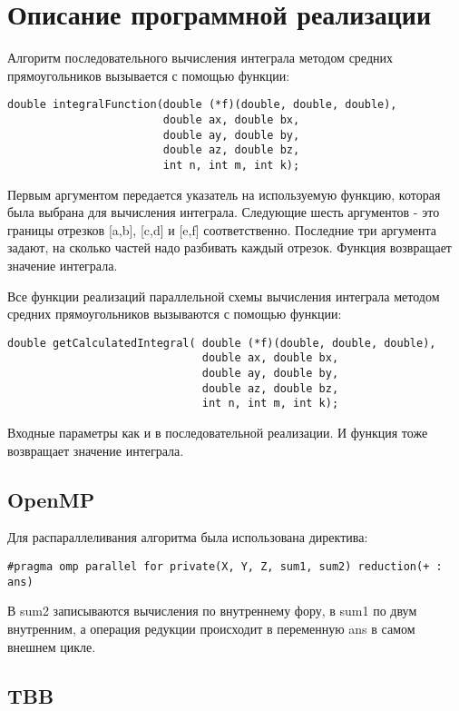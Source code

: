 \documentclass{report}
\begin{document}
\section*{Описание программной реализации}
Алгоритм последовательного вычисления интеграла методом средних прямоугольников вызывается с помощью функции:
\begin{lstlisting}
double integralFunction(double (*f)(double, double, double),
                        double ax, double bx,
                        double ay, double by,
                        double az, double bz,
                        int n, int m, int k);
\end{lstlisting}
\par Первым аргументом передается указатель на используемую функцию, которая была выбрана для вычисления интеграла. Следующие шесть аргументов - это границы отрезков [a,b], [c,d] и [e,f] соответственно. Последние три аргумента задают, на сколько частей надо разбивать каждый отрезок. Функция возвращает значение интеграла.
\par Все функции реализаций параллельной схемы вычисления интеграла методом средних прямоугольников вызываются с помощью функции:
\begin{lstlisting}
double getCalculatedIntegral( double (*f)(double, double, double),
                              double ax, double bx,
                              double ay, double by,
                              double az, double bz,
                              int n, int m, int k);
\end{lstlisting}
\par Входные параметры как и в последовательной реализации. И функция тоже возвращает значение интеграла.
\newpage

\subsection*{OpenMP}
Для распараллеливания алгоритма была использована директива:
\par \verb|#pragma omp parallel for private(X, Y, Z, sum1, sum2) reduction(+ : ans)|
\par В sum2 записываются вычисления по внутреннему фору, в sum1 по двум внутренним, а операция редукции происходит в переменную ans в самом внешнем цикле.
\subsection*{TBB}
\end{document}

